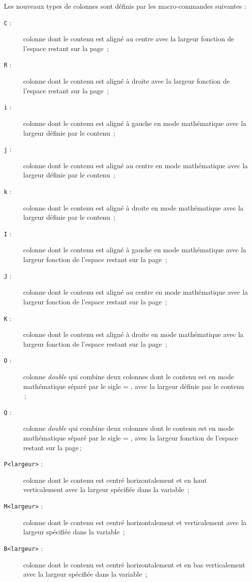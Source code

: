 \documentclass[a4paper, 11pt, twoside, fleqn]{memoir}
\begin{document}
Les nouveaux types de colonnes sont définis par les macro-commandes suivantes :
\begin{description}
\item[\texttt{C} :] colonne dont le contenu est aligné au centre avec la largeur fonction de l'espace restant sur la page \,;
\item[\texttt{R} :] colonne dont le contenu est aligné à droite avec la largeur fonction de l'espace restant sur la page \,;
\item[\texttt{i} :] colonne dont le contenu est aligné à gauche en mode mathématique avec la largeur définie par le contenu \,;
\item[\texttt{j} :] colonne dont le contenu est aligné au centre en mode mathématique avec la largeur définie par le contenu \,;
\item[\texttt{k} :] colonne dont le contenu est aligné à droite en mode mathématique avec la largeur définie par le contenu \,;
\item[\texttt{I} :] colonne dont le contenu est aligné à gauche en mode mathématique avec la largeur fonction de l'espace restant sur la page \,;
\item[\texttt{J} :] colonne dont le contenu est aligné au centre en mode mathématique avec la largeur fonction de l'espace restant sur la page \,;
\item[\texttt{K} :] colonne dont le contenu est aligné à droite en mode mathématique avec la largeur fonction de l'espace restant sur la page \,;
\item[\texttt{O} :] colonne \emph{double} qui combine deux colonnes dont le contenu est en mode mathématique séparé par le sigle = , avec la largeur définie par le contenu \,;
\item[\texttt{Q} :] colonne \emph{double} qui combine deux colonnes dont le contenu est en mode mathématique séparé par le sigle = , avec la largeur fonction de l'espace restant sur la page\,;
\item[\texttt{P{<largeur>}} :] colonne dont le contenu est centré horizontalement et en haut verticalement avec la largeur spécifiée dans la variable \,;
\item[\texttt{M{<largeur>}} :] colonne dont le contenu est centré horizontalement et verticalement avec la largeur spécifiée dans la variable \,;
\item[\texttt{B{<largeur>}} :] colonne dont le contenu est centré horizontalement et en bas verticalement avec la largeur spécifiée dans la variable \,;\\
\end{description}
\end{document}
